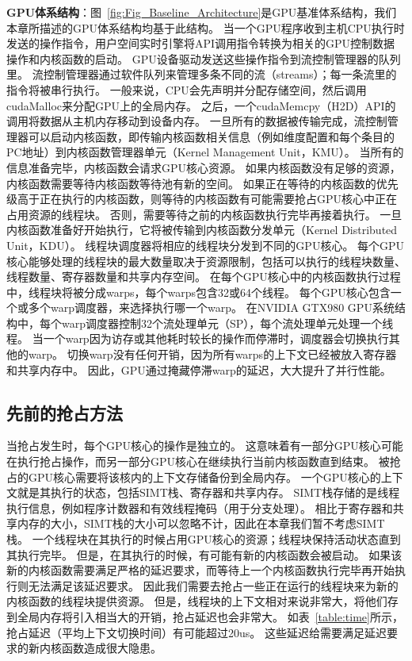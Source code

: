 \textbf{GPU体系结构}：图~\ref{fig:Fig_Baseline_Architecture}是GPU基准体系结构，我们本章所描述的GPU体系结构均基于此结构。
当一个GPU程序收到主机CPU执行时发送的操作指令，用户空间实时引擎将API调用指令转换为相关的GPU控制数据操作和内核函数的启动。
GPU设备驱动发送这些操作指令到流控制管理器的队列里。
流控制管理器通过软件队列来管理多条不同的流（streams）；每一条流里的指令将被串行执行。
一般来说，CPU会先声明并分配存储空间，然后调用cudaMalloc来分配GPU上的全局内存。
之后，一个cudaMemcpy（H2D）API的调用将数据从主机内存移动到设备内存。
一旦所有的数据被传输完成，流控制管理器可以启动内核函数，即传输内核函数相关信息（例如维度配置和每个条目的PC地址）到内核函数管理器单元（Kernel Management Unit，KMU）。
当所有的信息准备完毕，内核函数会请求GPU核心资源。
如果内核函数没有足够的资源，内核函数需要等待内核函数等待池有新的空间。
如果正在等待的内核函数的优先级高于正在执行的内核函数，则等待的内核函数有可能需要抢占GPU核心中正在占用资源的线程块。
否则，需要等待之前的内核函数执行完毕再接着执行。
一旦内核函数准备好开始执行，它将被传输到内核函数分发单元（Kernel Distributed Unit，KDU）。
线程块调度器将相应的线程块分发到不同的GPU核心。
每个GPU核心能够处理的线程块的最大数量取决于资源限制，包括可以执行的线程块数量、线程数量、寄存器数量和共享内存空间。
在每个GPU核心中的内核函数执行过程中，线程块将被分成warps，每个warps包含32或64个线程。
每个GPU核心包含一个或多个warp调度器，来选择执行哪一个warp。
在NVIDIA GTX980 GPU系统结构中，每个warp调度器控制32个流处理单元（SP），每个流处理单元处理一个线程。
当一个warp因为访存或其他耗时较长的操作而停滞时，调度器会切换执行其他的warp。
切换warp没有任何开销，因为所有warps的上下文已经被放入寄存器和共享内存中。
因此，GPU通过掩藏停滞warp的延迟，大大提升了并行性能。

\subsection{先前的抢占方法}

当抢占发生时，每个GPU核心的操作是独立的。
这意味着有一部分GPU核心可能在执行抢占操作，而另一部分GPU核心在继续执行当前内核函数直到结束。
被抢占的GPU核心需要将该核内的上下文存储备份到全局内存。
一个GPU核心的上下文就是其执行的状态，包括SIMT栈、寄存器和共享内存。
SIMT栈存储的是线程执行信息，例如程序计数器和有效线程掩码（用于分支处理）。
相比于寄存器和共享内存的大小，SIMT栈的大小可以忽略不计，因此在本章我们暂不考虑SIMT栈。
一个线程块在其执行的时候占用GPU核心的资源；线程块保持活动状态直到其执行完毕。
但是，在其执行的时候，有可能有新的内核函数会被启动。
如果该新的内核函数需要满足严格的延迟要求，而等待上一个内核函数执行完毕再开始执行则无法满足该延迟要求。
因此我们需要去抢占一些正在运行的线程块来为新的内核函数的线程块提供资源。
但是，线程块的上下文相对来说非常大，将他们存到全局内存将引入相当大的开销，抢占延迟也会非常大。
如表~\ref{table:time}所示，抢占延迟（平均上下文切换时间）有可能超过20us。
这些延迟给需要满足延迟要求的新内核函数造成很大隐患。

